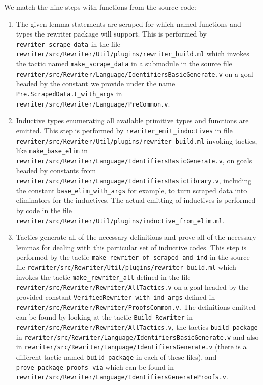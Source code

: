 \begin{subappendices}
We match the nine steps with functions from the source code:
\begin{enumerate}
  \item
    The given lemma statements are scraped for which named functions and types the rewriter package will support.
    This is performed by \texttt{rewriter\_scrape\_data} in the file \texttt{rewriter/src/Rewriter/Util/plugins/rewriter\_build.ml} which invokes the \Ltac{} tactic named \texttt{make\_scrape\_data} in a submodule in the source file \texttt{rewriter/src/Rewriter/Language/IdentifiersBasicGenerate.v} on a goal headed by the constant we provide under the name \texttt{Pre.ScrapedData.t\_with\_args} in \texttt{rewriter/src/Rewriter/Language/PreCommon.v}.
  \item
    Inductive types enumerating all available primitive types and functions are emitted.
    This step is performed by \texttt{rewriter\_emit\_inductives} in file \texttt{rewriter/src/Rewriter/Util/plugins/rewriter\_build.ml} invoking tactics, like \texttt{make\_base\_elim} in \texttt{rewriter/src/Rewriter/Language/IdentifiersBasicGenerate.v}, on goals headed by constants from \texttt{rewriter/src/Rewriter/Language/IdentifiersBasicLibrary.v}, including the constant \texttt{base\_elim\_with\_args} for example, to turn scraped data into eliminators for the inductives.
    The actual emitting of inductives is performed by code in the file \texttt{rewriter/src/Rewriter/Util/plugins/inductive\_from\_elim.ml}.
  \item
    Tactics generate all of the necessary definitions and prove all of the necessary lemmas for dealing with this particular set of inductive codes.
    This step is performed by the tactic \texttt{make\_rewriter\_of\_scraped\_and\_ind} in the source file \texttt{rewriter/src/Rewriter/Util/plugins/rewriter\_build.ml} which invokes the tactic \texttt{make\_rewriter\_all} defined in the file \texttt{rewriter/src/Rewriter/Rewriter/AllTactics.v} on a goal headed by the provided constant \texttt{VerifiedRewriter\_with\_ind\_args} defined in \texttt{rewriter/src/Rewriter/Rewriter/ProofsCommon.v}.
    The definitions emitted can be found by looking at the tactic \texttt{Build\_Rewriter} in \texttt{rewriter/src/Rewriter/Rewriter/AllTactics.v}, the \Ltac{} tactics \texttt{build\_package} in \texttt{rewriter/src/Rewriter/Language/IdentifiersBasicGenerate.v} and also in \texttt{rewriter/src/Rewriter/Language/IdentifiersGenerate.v} (there is a different tactic named \texttt{build\_package} in each of these files), and \texttt{prove\_package\_proofs\_via} which can be found in \texttt{rewriter/src/Rewriter/Language/IdentifiersGenerateProofs.v}.

\end{enumerate}
\end{subappendices}
